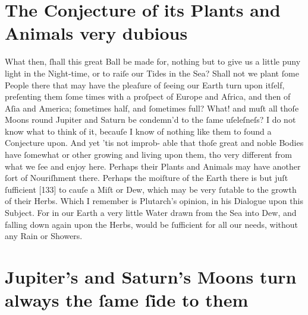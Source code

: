 \documentclass[letterpaper]{book}
\begin{document}
\section{The Conjecture of its Plants and Animals very dubious}

What then, ſhall this great Ball be made for, nothing but to give us a little
puny light in the Night-time, or to raiſe our Tides in the Sea? Shall not
we plant ſome People there that may have the pleaſure of ſeeing our Earth
turn upon itſelf, preſenting them ſome times with a proſpect of Europe and
Africa, and then of Aſia and America; ſometimes half, and ſometimes full?
What! and muſt all thoſe Moons round Jupiter and Saturn be condemn'd
to the ſame uſeleſneſs? I do not know what to think of it, becauſe I know
of nothing like them to found a Conjecture upon. And yet 'tis not improb-
able that thoſe great and noble Bodies have ſomewhat or other growing
and living upon them, tho very different from what we ſee and enjoy here.
Perhaps their Plants and Animals may have another ſort of Nouriſhment
there. Perhaps the moiſture of the Earth there is but juſt ſufficient [133]
to cauſe a Miſt or Dew, which may be very ſutable to the growth of their
Herbs. Which I remember is Plutarch's opinion, in his Dialogue upon this
Subject. For in our Earth a very little Water drawn from the Sea into Dew,
and falling down again upon the Herbs, would be ſufficient for all our needs,
without any Rain or Showers.


\section{Jupiter's and Saturn's Moons turn always the ſame ſide to them}
\end{document}
